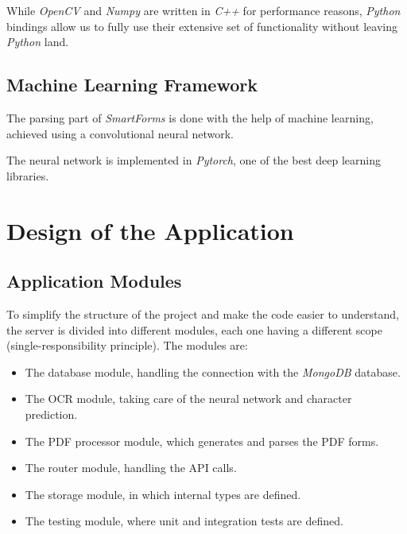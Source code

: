 \documentclass[12pt, a4paper]{report}
\begin{document}
While \textit{OpenCV} and \textit{Numpy} are written in \textit{C++} for performance reasons, \textit{Python} bindings allow us to fully use their extensive set of functionality without leaving \textit{Python} land.

\section{Machine Learning Framework}

The parsing part of \textit{SmartForms} is done with the help of machine learning, achieved using a convolutional neural network.

The neural network is implemented in \textit{Pytorch}, one of the best deep learning libraries.




\chapter{Design of the Application}


\section{Application Modules}

To simplify the structure of the project and make the code easier to understand, the server is divided into different modules, each one having a different scope (single-responsibility principle). The modules are:
\begin{itemize}
    \item The database module, handling the connection with the \textit{MongoDB} database.
    \item The OCR module, taking care of the neural network and character prediction.
    \item The PDF processor module, which generates and parses the PDF forms.
    \item The router module, handling the API calls.
    \item The storage module, in which internal types are defined.
    \item The testing module, where unit and integration tests are defined.
\end{itemize}
\end{document}
